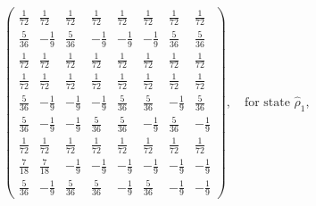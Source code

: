 \documentclass[a4paper]{article}
\begin{document}
  \begin{equation}
    \displaystyle \left(\begin{array}{rrrrrrrr}
    \frac{1}{72} & \frac{1}{72} & \frac{1}{72} &
    \frac{1}{72} & \frac{1}{72} & \frac{1}{72} &
    \frac{1}{72} & \frac{1}{72} \\ [6pt]
    \frac{5}{36} & -\frac{1}{9} & \frac{5}{36} &
    -\frac{1}{9} & -\frac{1}{9} & -\frac{1}{9} &
    \frac{5}{36} & \frac{5}{36} \\ [6pt]
    \frac{1}{72} & \frac{1}{72} & \frac{1}{72} &
    \frac{1}{72} & \frac{1}{72} & \frac{1}{72} &
    \frac{1}{72} & \frac{1}{72} \\ [6pt]
    \frac{1}{72} & \frac{1}{72} & \frac{1}{72} &
    \frac{1}{72} & \frac{1}{72} & \frac{1}{72} &
    \frac{1}{72} & \frac{1}{72} \\ [6pt]
    \frac{5}{36} & -\frac{1}{9} & -\frac{1}{9} &
    -\frac{1}{9} & \frac{5}{36} & \frac{5}{36} &
    -\frac{1}{9} & \frac{5}{36} \\ [6pt]
    \frac{5}{36} & -\frac{1}{9} & -\frac{1}{9} &
    \frac{5}{36} & \frac{5}{36} & -\frac{1}{9} &
    \frac{5}{36} & -\frac{1}{9} \\ [6pt]
    \frac{1}{72} & \frac{1}{72} & \frac{1}{72} &
    \frac{1}{72} & \frac{1}{72} & \frac{1}{72} &
    \frac{1}{72} & \frac{1}{72} \\ [6pt]
    \frac{7}{18} & \frac{7}{18} & -\frac{1}{9} &
    -\frac{1}{9} & -\frac{1}{9} & -\frac{1}{9} &
    -\frac{1}{9} & -\frac{1}{9} \\ [6pt]
    \frac{5}{36} & -\frac{1}{9} & \frac{5}{36} &
    \frac{5}{36} & -\frac{1}{9} & \frac{5}{36} &
    -\frac{1}{9} & -\frac{1}{9}
    \end{array}\right),
    \quad
    \text{for state } \hat\rho_1,
  \end{equation}
\end{document}
